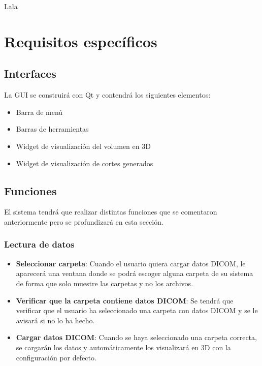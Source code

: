 Lala

\section{Requisitos específicos}

\subsection{Interfaces}

La GUI se construirá con Qt y contendrá los siguientes elementos:
\begin{itemize}
	\item Barra de menú
	\item Barras de herramientas
	\item Widget de visualización del volumen en 3D
	\item Widget de visualización de cortes generados
\end{itemize}

\subsection{Funciones}

El sistema tendrá que realizar distintas funciones que se comentaron anteriormente pero se profundizará en esta sección.

\subsubsection{Lectura de datos}
\begin{itemize}
	\item \textbf{Seleccionar carpeta}: Cuando el usuario quiera cargar datos DICOM, le aparecerá una ventana donde se podrá escoger alguna carpeta de su sistema de forma que solo muestre las carpetas y no los archivos.
	\item \textbf{Verificar que la carpeta contiene datos DICOM}: Se tendrá que verificar que el usuario ha seleccionado una carpeta con datos DICOM y se le avisará si no lo ha hecho.
	\item \textbf{Cargar datos DICOM}: Cuando se haya seleccionado una carpeta correcta, se cargarán los datos y automáticamente los visualizará en 3D con la configuración por defecto.
\end{itemize}

